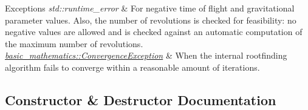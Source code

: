 \begin{DoxyExceptions}{Exceptions}
{\em std\+::runtime\+\_\+error} & For negative time of flight and gravitational parameter values. Also, the number of revolutions is checked for feasibility\+: no negative values are allowed and is checked against an automatic computation of the maximum number of revolutions. \\
\hline
{\em \hyperlink{structtudat_1_1basic__mathematics_1_1ConvergenceException}{basic\+\_\+mathematics\+::\+Convergence\+Exception}} & When the internal rootfinding algorithm fails to converge within a reasonable amount of iterations. \\
\hline
\end{DoxyExceptions}


\subsection{Constructor \& Destructor Documentation}
